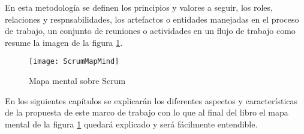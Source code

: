 En esta metodología se definen los principios y valores a seguir, los roles, relaciones y respnsabilidades, los artefactos o entidades manejadas en el proceso de trabajo, un conjunto de reuniones o actividades en un flujo de trabajo como resume la imagen de la figura \ref{fig:ScrumMapMind}.

\begin{figure}[h]
  \centering
  \texttt{[image: ScrumMapMind]}
  \caption{Mapa mental sobre Scrum}
  \centering
  \label{fig:ScrumMapMind} %
\end{figure}

En los siguientes capítulos se explicarán los diferentes aspectos y características de la propuesta de este marco de trabajo con lo que 
al final del libro el mapa mental de la figura \ref{fig:ScrumMapMind} quedará explicado y será fácilmente entendible. 
